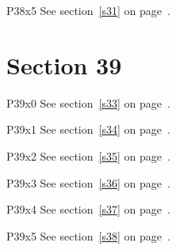 P38x5 \w\w\w\w\w\w See section~\ref{s31} on page~\pageref{s39}.

\section{Section 39}\label{s39}
P39x0 \w\w\w\w\w\w See section~\ref{s33} on page~\pageref{s37}.

P39x1 \w\w\w\w\w\w See section~\ref{s34} on page~\pageref{s38}.

P39x2 \w\w\w\w\w\w See section~\ref{s35} on page~\pageref{s39}.

P39x3 \w\w\w\w\w\w See section~\ref{s36} on page~\pageref{s0}.

P39x4 \w\w\w\w\w\w See section~\ref{s37} on page~\pageref{s1}.

P39x5 \w\w\w\w\w\w See section~\ref{s38} on page~\pageref{s2}.



